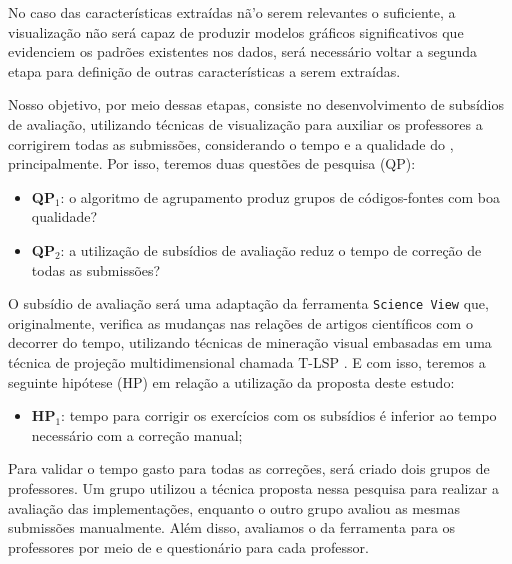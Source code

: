 	 	No caso das características extraídas nã'o serem relevantes o suficiente, a
	 	visualização não será capaz de produzir modelos gráficos significativos que
	 	evidenciem os padrões existentes nos dados, será necessário voltar a segunda
	 	etapa para definição de outras características a serem extraídas.
	 	
	 	Nosso objetivo, por meio dessas etapas, consiste no desenvolvimento de subsídios
	 	de avaliação, utilizando técnicas de visualização para auxiliar os professores a
	 	corrigirem todas as submissões, considerando o tempo e a qualidade do ,
	 	principalmente. Por isso, teremos duas questões de pesquisa (QP):
	 	
	 	\begin{itemize}
	 		\item \textbf{QP$_1$}: o algoritmo de agrupamento produz grupos de códigos-fontes
	 		com boa qualidade?
	 		\item \textbf{QP$_2$}: a utilização de subsídios de avaliação reduz o tempo %
	 		de correção de todas as submissões?
	 	\end{itemize}
	 	
	 	O subsídio de avaliação será uma adaptação da ferramenta \texttt{Science View}
	 	\cite{Alencar-etal:2012} que, originalmente, verifica as mudanças nas relações
	 	de artigos científicos com o decorrer do tempo, utilizando técnicas de mineração
	 	visual embasadas em uma técnica de projeção multidimensional chamada \acl{T-LSP}
	 	\cite{Alencar}. E com isso, teremos a seguinte hipótese (HP) em relação a
	 	utilização da proposta deste estudo:
	 	
	 	\begin{itemize}
	 		\item \textbf{HP$_1$}: tempo para corrigir os exercícios com os subsídios é inferior  %
	 		ao tempo necessário com a correção manual;
	 	\end{itemize}
	 	
	 	Para validar o tempo gasto para todas as correções, será criado dois grupos de
	 	professores. Um grupo utilizou a técnica proposta nessa pesquisa para realizar
	 	a avaliação das implementações, enquanto o outro grupo avaliou as mesmas submissões
	 	manualmente. Além disso, avaliamos o  da ferramenta para os
	 	professores por meio de  e questionário para cada professor.
	 		
